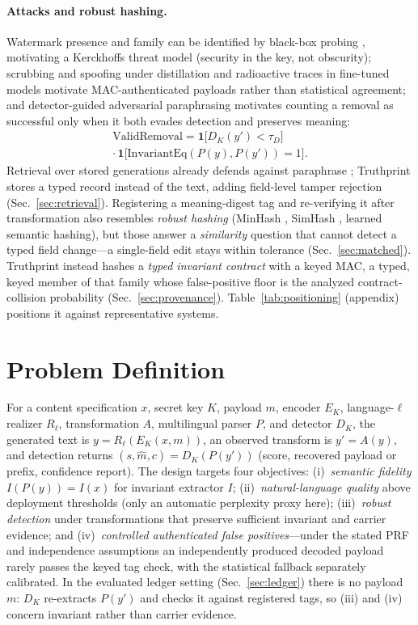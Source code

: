 \documentclass[11pt]{article}
\begin{document}
\paragraph{Attacks and robust hashing.}
\label{sec:relhash}
Watermark presence and family can be identified by black-box probing \cite{gloaguen2024blackbox}, motivating a Kerckhoffs threat model (security in the key, not obscurity); scrubbing and spoofing under distillation \cite{yi2025unifiedattacks} and radioactive traces in fine-tuned models \cite{sander2024radioactive} motivate MAC-authenticated payloads rather than statistical agreement; and detector-guided adversarial paraphrasing \cite{cheng2025adversarial} motivates counting a removal as successful only when it both evades detection and preserves meaning:
\begin{multline}
\label{eq:validremoval}
\mathrm{ValidRemoval}=\mathbf{1}\big[D_K(y')<\tau_D\big]\\
\cdot\,\mathbf{1}\big[\mathrm{InvariantEq}(P(y),P(y'))=1\big].
\end{multline}
Retrieval over stored generations already defends against paraphrase \cite{krishna2023retrieval}; Truthprint stores a typed record instead of the text, adding field-level tamper rejection (Sec.~\ref{sec:retrieval}). Registering a meaning-digest tag and re-verifying it after transformation also resembles \emph{robust hashing} (MinHash \cite{broder1997minhash}, SimHash \cite{charikar2002simhash}, learned semantic hashing), but those answer a \emph{similarity} question that cannot detect a typed field change---a single-field edit stays within tolerance (Sec.~\ref{sec:matched}). Truthprint instead hashes a \emph{typed invariant contract} with a keyed MAC, a typed, keyed member of that family whose false-positive floor is the analyzed contract-collision probability (Sec.~\ref{sec:provenance}). Table~\ref{tab:positioning} (appendix) positions it against representative systems.

\section{Problem Definition}
For a content specification $x$, secret key $K$, payload $m$, encoder $E_K$, language-$\ell$ realizer $R_\ell$, transformation $A$, multilingual parser $P$, and detector $D_K$, the generated text is $y=R_\ell(E_K(x,m))$, an observed transform is $y'=A(y)$, and detection returns $(s,\hat{m},c)=D_K(P(y'))$ (score, recovered payload or prefix, confidence report). The design targets four objectives: (i)~\emph{semantic fidelity} $I(P(y))=I(x)$ for invariant extractor $I$; (ii)~\emph{natural-language quality} above deployment thresholds (only an automatic perplexity proxy here); (iii)~\emph{robust detection} under transformations that preserve sufficient invariant and carrier evidence; and (iv)~\emph{controlled authenticated false positives}---under the stated PRF and independence assumptions an independently produced decoded payload rarely passes the keyed tag check, with the statistical fallback separately calibrated. In the evaluated ledger setting (Sec.~\ref{sec:ledger}) there is no payload $m$: $D_K$ re-extracts $P(y')$ and checks it against registered tags, so (iii) and (iv) concern invariant rather than carrier evidence.
\end{document}
